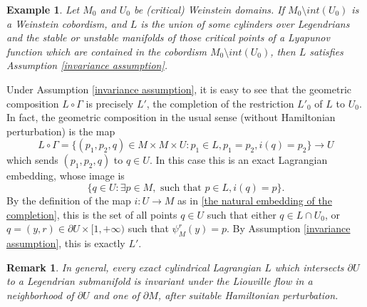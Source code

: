 \documentclass{amsart}
\newtheorem{remark}[theorem]{Remark}
\newtheorem{example}[theorem]{Example}
\numberwithin{equation}{section}
\numberwithin{figure}{section}
\begin{document}
\begin{example}
	Let $M_{0}$ and $U_{0}$ be (critical) Weinstein domains. If $M_{0} \setminus int(U_{0})$ is a Weinstein cobordism, and $L$ is the union of some cylinders over Legendrians and the stable or unstable manifolds of those critical points of a Lyapunov function which are contained in the cobordism $M_{0} \setminus int(U_{0})$, then $L$ satisfies Assumption \ref{invariance assumption}.
\end{example}

	Under Assumption \ref{invariance assumption}, it is easy to see that the geometric composition $L \circ \Gamma$ is precisely $L'$, the completion of the restriction $L'_{0}$ of $L$ to $U_{0}$. In fact, the geometric composition in the usual sense (without Hamiltonian perturbation) is the map
\begin{equation*}
L \circ \Gamma = \{(p_{1}, p_{2}, q) \in M \times M \times U: p_{1} \in L, p_{1} = p_{2}, i(q) = p_{2}\} \to U
\end{equation*}
which sends $(p_{1}, p_{2}, q)$ to $q \in U$. In this case this is an exact Lagrangian embedding, whose image is
\begin{equation*}
\{q \in U: \exists p \in M, \text{ such that } p \in L, i(q) = p\}.
\end{equation*}
By the definition of the map $i: U \to M$ as in \eqref{the natural embedding of the completion}, this is the set of all points $q \in U$ such that either $q \in L \cap U_{0}$, or $q = (y, r) \in \partial U \times [1, +\infty)$ such that $\psi_{M}^{r}(y) = p$. By Assumption \ref{invariance assumption}, this is exactly $L'$. \par

\begin{remark}
	In general, every exact cylindrical Lagrangian $L$ which intersects $\partial U$ to a Legendrian submanifold is invariant under the Liouville flow in a neighborhood of $\partial U$ and one of $\partial M$, after suitable Hamiltonian perturbation. 
\end{remark}
\end{document}
